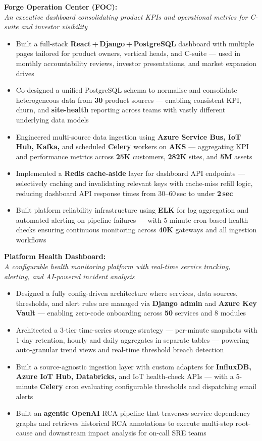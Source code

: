 \documentclass[9pt]{article}
\newcommand{\subp}[2]{\vspace{3pt}\noindent\textbf{#1:}\\[-2pt]\noindent\textit{#2}\vspace{0pt}}
\begin{document}
\subp{Forge Operation Center (FOC)}{An executive dashboard consolidating product KPIs and operational metrics for C-suite and investor visibility}
\begin{itemize}
  \item Built a full-stack \textbf{React\,+\,Django\,+\,PostgreSQL} dashboard with multiple pages
        tailored for product owners, vertical heads, and C-suite — used in monthly
        accountability reviews, investor presentations, and market expansion drives
  \item Co-designed a unified PostgreSQL schema to normalise and consolidate heterogeneous
        data from \textbf{30} product sources — enabling consistent KPI, churn, and
        \textbf{site-health} reporting across teams with vastly different underlying data models
  \item Engineered multi-source data ingestion using \textbf{Azure Service Bus, IoT Hub, Kafka,}
        and scheduled \textbf{Celery} workers on \textbf{AKS} — aggregating KPI and performance
        metrics across \textbf{25K} customers, \textbf{282K} sites, and \textbf{5M} assets
  \item Implemented a \textbf{Redis} \textbf{cache-aside} layer for dashboard API endpoints —
        selectively caching and invalidating relevant keys with cache-miss refill logic,
        reducing dashboard API response times from 30--60\,sec to under \textbf{2\,sec}
  \item Built platform reliability infrastructure using \textbf{ELK} for log aggregation and
        automated alerting on pipeline failures — with 5-minute cron-based health checks
        ensuring continuous monitoring across \textbf{40K} gateways and all ingestion workflows
\end{itemize}

\subp{Platform Health Dashboard}{A configurable health monitoring platform with real-time service tracking, alerting, and AI-powered incident analysis}
\begin{itemize}
  \item Designed a fully config-driven architecture where services, data sources, thresholds,
        and alert rules are managed via \textbf{Django admin} and \textbf{Azure Key Vault} —
        enabling zero-code onboarding across \textbf{50} services and 8 modules
  \item Architected a 3-tier time-series storage strategy — per-minute snapshots with 1-day
        retention, hourly and daily aggregates in separate tables — powering auto-granular
        trend views and real-time threshold breach detection
  \item Built a source-agnostic ingestion layer with custom adapters for \textbf{InfluxDB,
        Azure IoT Hub, Databricks,} and IoT health-check APIs — with a 5-minute
        \textbf{Celery} cron evaluating configurable thresholds and dispatching email alerts
  \item Built an \textbf{agentic OpenAI} RCA pipeline that traverses service dependency graphs
        and retrieves historical RCA annotations to execute multi-step root-cause and
        downstream impact analysis for on-call SRE teams
\end{itemize}
\end{document}
